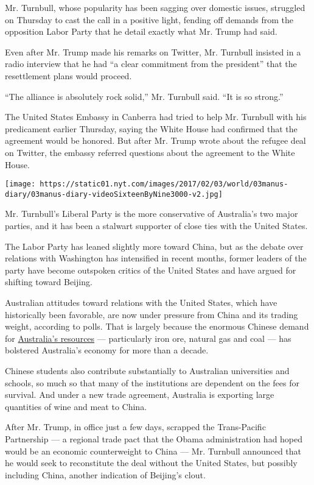 Mr. Turnbull, whose popularity has been sagging over domestic issues,
struggled on Thursday to cast the call in a positive light, fending off
demands from the opposition Labor Party that he detail exactly what Mr.
Trump had said.

Even after Mr. Trump made his remarks on Twitter, Mr. Turnbull insisted
in a radio interview that he had ``a clear commitment from the
president'' that the resettlement plans would proceed.

``The alliance is absolutely rock solid,'' Mr. Turnbull said. ``It is so
strong.''

The United States Embassy in Canberra had tried to help Mr. Turnbull
with his predicament earlier Thursday, saying the White House had
confirmed that the agreement would be honored. But after Mr. Trump wrote
about the refugee deal on Twitter, the embassy referred questions about
the agreement to the White House.

\texttt{[image: https://static01.nyt.com/images/2017/02/03/world/03manus-diary/03manus-diary-videoSixteenByNine3000-v2.jpg]}

Mr. Turnbull's Liberal Party is the more conservative of Australia's two
major parties, and it has been a stalwart supporter of close ties with
the United States.

The Labor Party has leaned slightly more toward China, but as the debate
over relations with Washington has intensified in recent months, former
leaders of the party have become outspoken critics of the United States
and have argued for shifting toward Beijing.

Australian attitudes toward relations with the United States, which have
historically been favorable, are now under pressure from China and its
trading weight, according to polls. That is largely because the enormous
Chinese demand for
\href{http://dfat.gov.au/trade/resources/Documents/chin.pdf}{Australia's
resources} --- particularly iron ore, natural gas and coal --- has
bolstered Australia's economy for more than a decade.

Chinese students also contribute substantially to Australian
universities and schools, so much so that many of the institutions are
dependent on the fees for survival. And under a new trade agreement,
Australia is exporting large quantities of wine and meat to China.

After Mr. Trump, in office just a few days, scrapped the Trans-Pacific
Partnership --- a regional trade pact that the Obama administration had
hoped would be an economic counterweight to China --- Mr. Turnbull
announced that he would seek to reconstitute the deal without the United
States, but possibly including China, another indication of Beijing's
clout.

